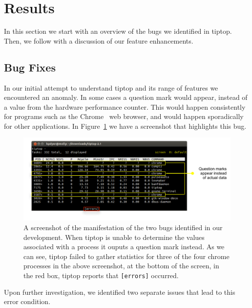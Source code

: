 \section{Results}
\label{sec:results}
In this section we start with an overview of the bugs we identified in tiptop. Then, we follow with a discussion of our feature enhancements.

\subsection{Bug Fixes}
In our initial attempt to understand tiptop and its range of features we encountered an anomaly.
In some cases a question mark would appear, instead of a value from the hardware performance counter.
This would happen consistently for programs such as the Chrome~\cite{xxx} web browser, and would happen sporadically for other applications.
In Figure~\ref{fig:tiptop-bug} we have a screenshot that highlights this bug.

\begin{figure}[t]
\footnotesize
\centering
\includegraphics[width=.9\textwidth]{tiptop-bug}
\caption{A screenshot of the manifestation of the two bugs identified in our development. When tiptop is unable to determine the values associated with a process it ouputs a question mark instead. As we can see, tiptop failed to gather statistics for three of the four chrome processes in the above screenshot, at the bottom of the screen, in the red box, tiptop reports that \texttt{[errors]} occurred.}
\label{fig:tiptop-bug}
\end{figure}

Upon further investigation, we identified two separate issues that lead to this error condition.

